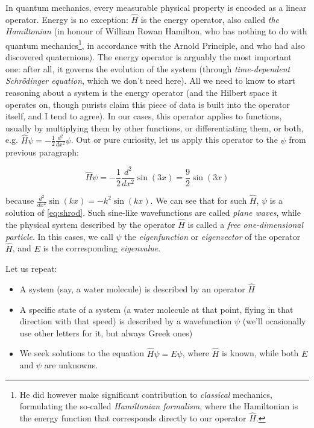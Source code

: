 \documentclass{article}
\begin{document}
In quantum mechanics, every measurable physical property is encoded as a linear operator. Energy is no exception: \(\hat H\) is the energy operator, also called \textit{the Hamiltonian} (in honour of William Rowan Hamilton, who has nothing to do with quantum mechanics\footnote{He did however make significant contribution to \textit{classical} mechanics, formulating the so-called \textit{Hamiltonian formalism}, where the Hamiltonian is the energy function that corresponds directly to our operator \(\hat H\).}, in accordance with the Arnold Principle, and who had also discovered quaternions). The energy operator is arguably the most important one: after all, it governs the evolution of the system (through \textit{time-dependent Schrödinger equation}, which we don't need here). All we need to know to start reasoning about a system is the energy operator (and the Hilbert space it operates on, though purists claim this piece of data is built into the operator itself, and I tend to agree). In our cases, this operator applies to functions, usually by multiplying them by other functions, or differentiating them, or both, e.g. \(\hat H \psi = -\frac{1}{2} \frac{d^2}{dx^2}\psi\). Out or pure curiosity, let us apply this operator to the \(\psi\) from previous paragraph:

\begin{equation} \hat H \psi = -\frac{1}{2} \frac{d^2}{dx^2} \sin(3x) = \frac{9}{2} \sin(3x) \end{equation}

because \(\frac{d^2}{dx^2} \sin(kx) = -k^2 \sin(kx)\). We can see that for such \(\hat H\), \(\psi\) is a solution of \eqref{eq:shrod}. Such sine-like wavefunctions are called \textit{plane waves}, while the physical system described by the operator \(\hat H\) is called a \textit{free one-dimensional particle}. In this cases, we call \(\psi\) the \textit{eigenfunction} or \textit{eigenvector} of the operator \(\hat H\), and \(E\) is the corresponding \textit{eigenvalue}.

Let us repeat:
\begin{itemize}
\item A system (say, a water molecule) is described by an operator \(\hat H\)
\item A specific state of a system (a water molecule at that point, flying in that direction with that speed) is described by a wavefunction \(\psi\) (we'll ocasionally use other letters for it, but always Greek ones)
\item We seek solutions to the equation \(\hat H \psi = E \psi\), where \(\hat H\) is known, while both \(E\) and \(\psi\) are unknowns. 
\end{itemize}
\end{document}
